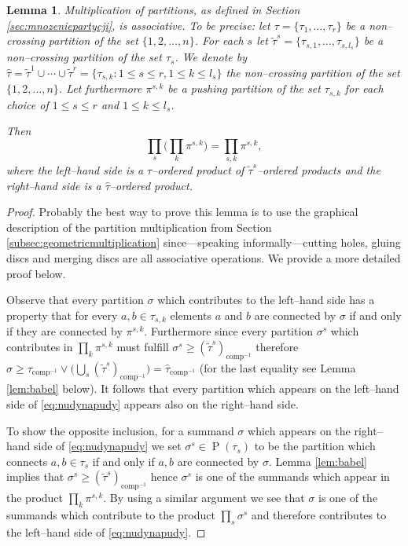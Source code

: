 \documentclass[12pt,dvips]{amsart}
\numberwithin{equation}{section} \numberwithin{figure}{section}
\theoremstyle{plain}
\newtheorem{lemma}{Lemma}[section]
\theoremstyle{definition}
\theoremstyle{remark}
\DeclareMathOperator{\comp}{comp}
\DeclareMathOperator{\PP}{P}
\begin{document}
\begin{lemma}
\label{lem:associative} Multiplication of partitions, as defined in
Section \ref{sec:mnozeniepartycji}, is associative. To be precise:
let $\tau=\{\tau_1,\dots,\tau_r\}$ be a non--crossing partition of
the set $\{1,2,\dots,n\}$. For each $s$ let
$\tilde{\tau}^s=\{\tau_{s,1},\dots,\tau_{s,l_s} \}$ be a
non--crossing partition of the set $\tau_s$. We denote by
$\hat{\tau}=\tilde{\tau}^1\cup\cdots\cup\tilde{\tau}^r = \{
\tau_{s,k}: 1\leq s\leq r, 1\leq k\leq l_s  \}$ the non--crossing
partition of the set $\{1,2,\dots,n\}$. Let furthermore $\pi^{s,k}$
be a pushing partition of the set $\tau_{s,k}$ for each choice of
$1\leq s\leq r$ and $1\leq k\leq l_s$.

Then
\begin{equation}
 \prod_s \Big(  \prod_k   \pi^{s,k}  \Big)= \prod_{s,k}   \pi^{s,k},
\label{eq:nudynapudy}
\end{equation}
where the left--hand side is a $\tau$--ordered product of
$\tilde{\tau}^s$--ordered products and the right--hand side is a
$\hat{\tau}$--ordered product.
\end{lemma}
\begin{proof}
Probably the best way to prove this lemma is to use the graphical
description of the partition multiplication from Section
\ref{subsec:geometricmultiplication} since---speaking
informally---cutting holes, gluing discs and merging discs are all
associative operations. We provide a more detailed proof below.




Observe that every partition $\sigma$ which contributes to the
left--hand side has a property that for every $a,b\in \tau_{s,k}$
elements $a$ and $b$ are connected by $\sigma$ if and only if they
are connected by $\pi^{s,k}$. Furthermore since every partition
$\sigma^s$ which contributes in $\prod_{k} \pi^{s,k}$ must fulfill
$\sigma^s \geq (\tilde{\tau}^s)_{\comp^{-1}}$ therefore $\sigma\geq
\tau_{\comp^{-1}}\vee\Big(\bigcup_s
(\tilde{\tau}^s)_{\comp^{-1}}\Big)=\hat{\tau}_{\comp^{-1}}$ (for the
last equality see Lemma \ref{lem:babel} below). It follows that
every partition which appears on the left--hand side of
\eqref{eq:nudynapudy} appears also on the right--hand side.

To show the opposite inclusion, for a summand $\sigma$ which appears
on the right--hand side of \eqref{eq:nudynapudy} we set $\sigma^s\in
\PP(\tau_s)$ to be the partition which connects $a,b\in \tau_s$ if
and only if $a,b$ are connected by $\sigma$. Lemma \ref{lem:babel}
implies that $\sigma^s\geq (\tilde{\tau}^s)_{\comp^{-1}}$ hence
$\sigma^s$ is one of the summands which appear in the product
$\prod_k \pi^{s,k}$. By using a similar argument we see that
$\sigma$ is one of the summands which contribute to the product
$\prod_s \sigma^s$ and therefore contributes to the left--hand side
of \eqref{eq:nudynapudy}.
\end{proof}
\end{document}
